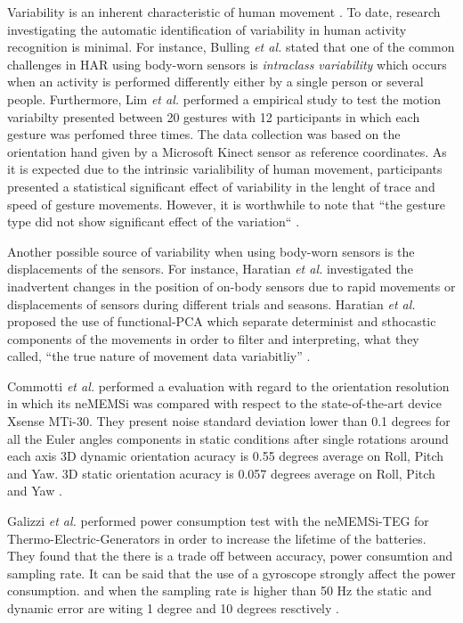 \documentclass[12pt,journal,onecolumn,compsoc]{IEEEtran}
\begin{document}
Variability is an inherent characteristic of human movement \cite{newell1993variability}.
To date, research investigating the automatic identification of variability in human activity recognition
is minimal. 
For instance, Bulling \textit{et al.} \cite{bulling2014} 
stated that one of the common challenges in HAR using body-worn sensors is
\textit{intraclass variability} which occurs when 
an activity is performed differently either by a single person or several people. 
Furthermore, Lim \textit{et al.} performed a empirical study to test the 
motion variabilty presented between 20 gestures with 12 participants
in which each gesture was perfomed three times.
The data collection was based on 
the orientation hand given by a Microsoft Kinect sensor as reference coordinates.
As it is expected due to the intrinsic varialibility of human movement,
participants presented a statistical significant effect of variability in the lenght of trace 
and speed of gesture movements.
However, it is worthwhile to note that
``the gesture type did not show significant effect of the variation`` \cite{Lim2012}.

Another possible source of variability when using body-worn sensors is the displacements of the 
sensors. For instance, 
Haratian \textit{et al.} investigated the inadvertent changes in the position of on-body sensors 
due to rapid movements or displacements of sensors during different trials and seasons.
Haratian \textit{et al.} proposed the use of functional-PCA 
which separate determinist and sthocastic components of the movements
in order to filter and interpreting, what they called, ``the true nature of movement data variabitliy'' 
\cite{Haratian2012,Haratian2014,Haratian2016}.



Commotti \textit{et al.} performed a 
evaluation with regard to the orientation resolution in which 
its neMEMSi was compared with respect to the state-of-the-art device Xsense MTi-30.
They present noise standard deviation lower than 0.1 degrees for all 
the Euler angles components in static conditions after single rotations around each axis
3D dynamic orientation acuracy is 0.55 degrees average on Roll, Pitch and Yaw.
3D static orientation acuracy is 0.057 degrees average on Roll, Pitch and Yaw 
\cite{Comotti2014}.

Galizzi \textit{et al.} performed power consumption test with the 
neMEMSi-TEG for Thermo-Electric-Generators in order to increase the lifetime of the batteries.
They found that the there is a trade off between accuracy, power consumtion and sampling rate.
It can be said that the use of a gyroscope strongly affect the power consumption.
and when the sampling rate is higher than 50 Hz the 
static and dynamic error are witing 1 degree and 10 degrees resctively \cite{Galizzi2015}.
 
\end{document}

